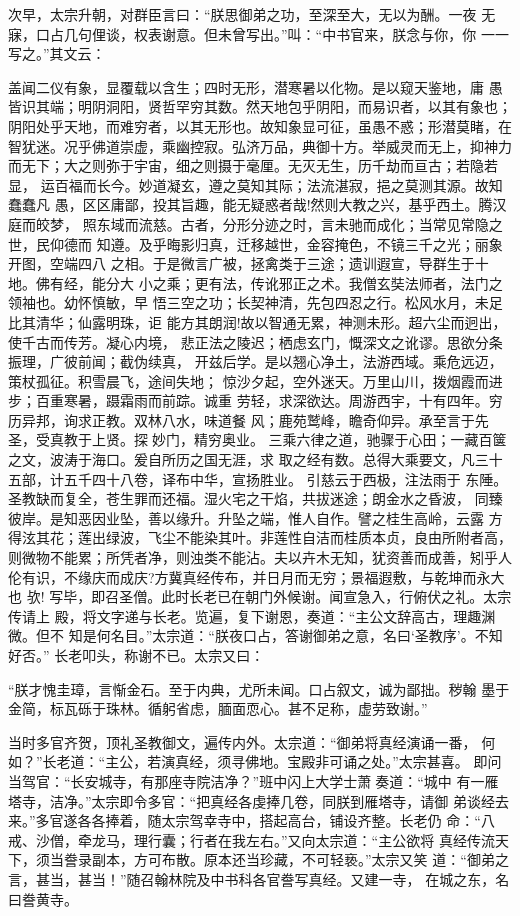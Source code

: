 次早，太宗升朝，对群臣言曰：“朕思御弟之功，至深至大，无以为酬。一夜
无寐，口占几句俚谈，权表谢意。但未曾写出。”叫：“中书官来，朕念与你，你
一一写之。”其文云：

盖闻二仪有象，显覆载以含生；四时无形，潜寒暑以化物。是以窥天鉴地，庸
愚皆识其端；明阴洞阳，贤哲罕穷其数。然天地包乎阴阳，而易识者，以其有象也；
阴阳处乎天地，而难穷者，以其无形也。故知象显可征，虽愚不惑；形潜莫睹，在
智犹迷。况乎佛道崇虚，乘幽控寂。弘济万品，典御十方。举威灵而无上，抑神力
而无下；大之则弥于宇宙，细之则摄于毫厘。无灭无生，历千劫而亘古；若隐若显，
运百福而长今。妙道凝玄，遵之莫知其际；法流湛寂，挹之莫测其源。故知蠢蠢凡
愚，区区庸鄙，投其旨趣，能无疑惑者哉!然则大教之兴，基乎西土。腾汉庭而皎梦，
照东域而流慈。古者，分形分迹之时，言未驰而成化；当常见常隐之世，民仰德而
知遵。及乎晦影归真，迁移越世，金容掩色，不镜三千之光；丽象开图，空端四八
之相。于是微言广被，拯禽类于三途；遗训遐宣，导群生于十地。佛有经，能分大
小之乘；更有法，传讹邪正之术。我僧玄奘法师者，法门之领袖也。幼怀慎敏，早
悟三空之功；长契神清，先包四忍之行。松风水月，未足比其清华；仙露明珠，讵
能方其朗润!故以智通无累，神测未形。超六尘而迥出，使千古而传芳。凝心内境，
悲正法之陵迟；栖虑玄门，慨深文之讹谬。思欲分条振理，广彼前闻；截伪续真，
开兹后学。是以翘心净土，法游西域。乘危远迈，策杖孤征。积雪晨飞，途间失地；
惊沙夕起，空外迷天。万里山川，拨烟霞而进步；百重寒暑，蹑霜雨而前踪。诚重
劳轻，求深欲达。周游西宇，十有四年。穷历异邦，询求正教。双林八水，味道餐
风；鹿苑鹫峰，瞻奇仰异。承至言于先圣，受真教于上贤。探妙门，精穷奥业。
三乘六律之道，驰骤于心田；一藏百箧之文，波涛于海口。爰自所历之国无涯，求
取之经有数。总得大乘要文，凡三十五部，计五千四十八卷，译布中华，宣扬胜业。
引慈云于西极，注法雨于
东陲。圣教缺而复全，苍生罪而还福。湿火宅之干焰，共拔迷途；朗金水之昏波，
同臻彼岸。是知恶因业坠，善以缘升。升坠之端，惟人自作。譬之桂生高岭，云露
方得泫其花；莲出绿波，飞尘不能染其叶。非莲性自洁而桂质本贞，良由所附者高，
则微物不能累；所凭者净，则浊类不能沾。夫以卉木无知，犹资善而成善，矧乎人
伦有识，不缘庆而成庆?方冀真经传布，并日月而无穷；景福遐敷，与乾坤而永大也
欤!
写毕，即召圣僧。此时长老已在朝门外候谢。闻宣急入，行俯伏之礼。太宗传请上
殿，将文字递与长老。览遍，复下谢恩，奏道：“主公文辞高古，理趣渊微。但不
知是何名目。”太宗道：“朕夜口占，答谢御弟之意，名曰‘圣教序’。不知好否。”
长老叩头，称谢不已。太宗又曰：

“朕才愧圭璋，言惭金石。至于内典，尤所未闻。口占叙文，诚为鄙拙。秽翰
墨于金简，标瓦砾于珠林。循躬省虑，腼面恧心。甚不足称，虚劳致谢。”

当时多官齐贺，顶礼圣教御文，遍传内外。太宗道：“御弟将真经演诵一番，
何如？”长老道：“主公，若演真经，须寻佛地。宝殿非可诵之处。”太宗甚喜。
即问当驾官：“长安城寺，有那座寺院洁净？”班中闪上大学士萧奏道：“城中
有一雁塔寺，洁净。”太宗即令多官：“把真经各虔捧几卷，同朕到雁塔寺，请御
弟谈经去来。”多官遂各各捧着，随太宗驾幸寺中，搭起高台，铺设齐整。长老仍
命：“八戒、沙僧，牵龙马，理行囊；行者在我左右。”又向太宗道：“主公欲将
真经传流天下，须当誊录副本，方可布散。原本还当珍藏，不可轻亵。”太宗又笑
道：“御弟之言，甚当，甚当！”随召翰林院及中书科各官誊写真经。又建一寺，
在城之东，名曰誊黄寺。

